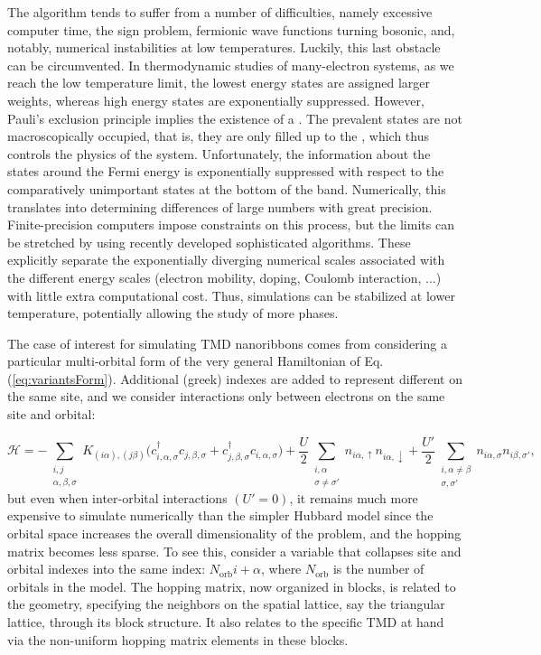 The algorithm tends to suffer from a number of difficulties, namely excessive computer time, the sign problem, fermionic wave functions turning bosonic, and, notably,  numerical instabilities at low temperatures.
Luckily, this last obstacle can be circumvented.
In thermodynamic studies of many-electron systems, as we reach the low temperature limit, the lowest energy states are assigned larger weights, whereas high energy states are exponentially suppressed.
However, Pauli's exclusion principle implies the existence of a .
The prevalent states are not macroscopically occupied, that is, they are only filled up to the , which thus controls the physics of the system.
Unfortunately, the information about the states around the Fermi energy is exponentially suppressed with respect to the comparatively unimportant states at the bottom of the band.
Numerically, this translates into determining differences of large numbers with great precision.
Finite-precision computers impose constraints on this process, but the limits can be stretched by using recently developed sophisticated algorithms.
These explicitly separate the exponentially diverging numerical scales associated with the different energy scales (electron mobility, doping, Coulomb interaction, ...) with little extra computational cost.
Thus, simulations can be stabilized at lower temperature, potentially allowing the study of more phases.

The case of interest for simulating \acs{TMD} nanoribbons comes from considering a particular multi-orbital form of the very general Hamiltonian of Eq.(\ref{eq:variantsForm}).
Additional (greek) indexes are added to represent different  on the same site, and we consider interactions only between electrons on the same site and  orbital:

\begin{equation}\label{eq:variantTMD}
\mathcal{H} = - \sum_{\substack{i, j \\ \alpha, \beta, \sigma}} K_{(i\alpha),(j\beta )} \bigg( c_{i,\alpha, \sigma}^\dagger c_{j,\beta, \sigma} + c_{j,\beta , \sigma}^\dagger c_{i,\alpha, \sigma} \bigg) + \frac{U}{2} \sum_{\substack{i, \alpha \\ \sigma \neq \sigma'} } n_{i\alpha, \uparrow} n_{i\alpha, \downarrow} + \frac{U'}{2} \sum_{\substack{i, \alpha \neq \beta \\ \sigma, \sigma'}} n_{i\alpha, \sigma} n_{i\beta, \sigma'} ,
\end{equation}
but even when inter-orbital interactions $(U' = 0)$, it remains much more expensive to simulate numerically than the simpler Hubbard model since the orbital space increases the overall dimensionality of the problem, and the hopping matrix becomes less sparse.
To see this, consider a variable that collapses site and orbital indexes into the same index: $ N_{\text{orb}} i + \alpha$, where $N_{\text{orb}}$ is the number of orbitals in the model.
The hopping matrix, now organized in blocks, is related to the geometry, specifying the neighbors on the spatial lattice, say the triangular lattice, through its block structure.
It also relates to the specific \acs{TMD} at hand via the non-uniform hopping matrix elements in these blocks.
